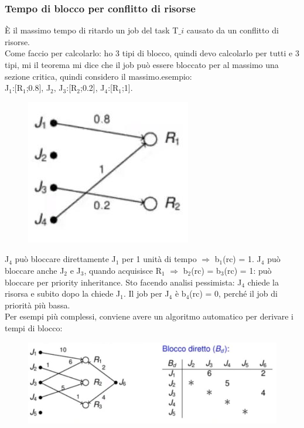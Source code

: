 \documentclass[12pt, oneside]{extbook}
\begin{document}
\subsubsection{Tempo di blocco per conflitto di risorse}
È il massimo tempo di ritardo un job del task T$\_{i}$ causato da un conflitto di risorse.\\ Come faccio per calcolarlo: ho 3 tipi di blocco, quindi devo calcolarlo per tutti e 3  tipi, mi il teorema mi dice che il job può essere bloccato per al massimo una sezione critica, quindi considero il massimo.esempio:\\ J$_{1}$:[R$_{1}$;0.8], J$_{2}$, J$_{3}$:[R$_{2}$;0.2], J$_{4}$:[R$_{1}$;1].\\ 
\begin{figure}[!h]
\centering
\includegraphics[scale=0.4]{immagini/image-028.jpg}
\end{figure}
J$_{4}$ può bloccare direttamente J$_{1}$ per 1 unità di tempo $\Rightarrow$ b$_{1}$(rc) = 1. J$_{4}$ può bloccare anche J$_{2}$ e J$_{3}$, quando acquisisce R$_{1}$ $\Rightarrow$ b$_{2}$(rc) = b$_{3}$(rc) = 1: può bloccare per priority inheritance. Sto facendo analisi pessimista: J$_{4}$ chiede la risorsa e subito dopo la chiede J$_{1}$. Il job per J$_{4}$ è b$_{4}$(rc) = 0, perché il job di priorità più bassa.\\ Per esempi più complessi, conviene avere un algoritmo automatico per derivare i tempi di blocco:
\begin{figure}[!h]
\centering
\includegraphics[scale=0.4]{immagini/image-029.jpg}
\end{figure}
\end{document}
